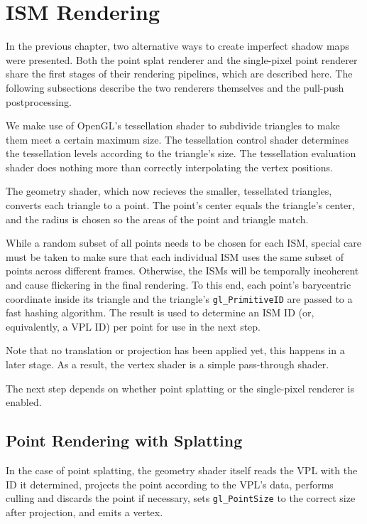 \section{ISM Rendering}
\label{sec:impl:ismRendering}

In the previous chapter, two alternative ways to create imperfect shadow maps were presented. Both the point splat renderer and the single-pixel point renderer share the first stages of their rendering pipelines, which are described here. The following subsections describe the two renderers themselves and the pull-push postprocessing.

We make use of OpenGL's tessellation shader to subdivide triangles to make them meet a certain maximum size. The tessellation control shader determines the tessellation levels according to the triangle's size. The tessellation evaluation shader does nothing more than correctly interpolating the vertex positions.

The geometry shader, which now recieves the smaller, tessellated triangles, converts each triangle to a point. The point's center equals the triangle's center, and the radius is chosen so the areas of the point and triangle match.


While a random subset of all points needs to be chosen for each ISM, special care must be taken to make sure that each individual ISM uses the same subset of points across different frames. Otherwise, the ISMs will be temporally incoherent and cause flickering in the final rendering. To this end, each point's barycentric coordinate inside its triangle and the triangle's \texttt{gl\_PrimitiveID} are passed to a fast hashing algorithm. The result is used to determine an ISM ID (or, equivalently, a VPL ID) per point for use in the next step.

Note that no translation or projection has been applied yet, this happens in a later stage. As a result, the vertex shader is a simple pass-through shader.

The next step depends on whether point splatting or the single-pixel renderer is enabled.



\subsection{Point Rendering with Splatting}
\label{sec:impl:splatting}

In the case of point splatting, the geometry shader itself reads the VPL with the ID it determined, projects the point according to the VPL's data, performs culling and discards the point if necessary, sets \texttt{gl\_PointSize} to the correct size after projection, and emits a vertex.


